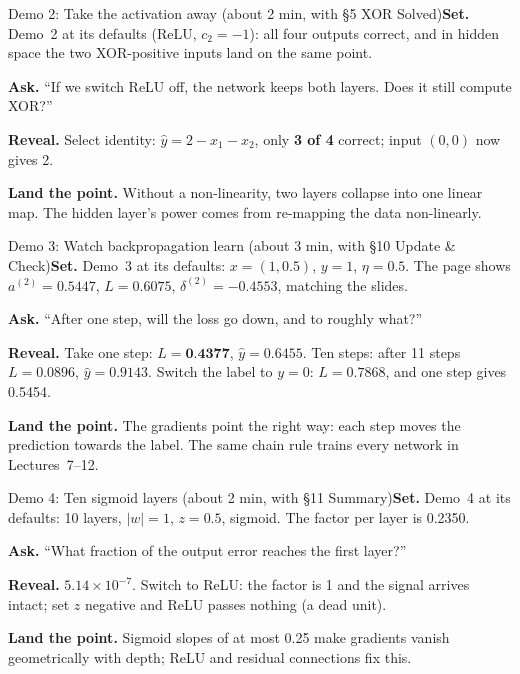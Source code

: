 \documentclass[11pt]{article}
\begin{document}
\begin{live}{Demo 2: Take the activation away (about 2 min, with \S5 XOR Solved)}\textbf{Set.} Demo~2 at its defaults (ReLU, $c_2=-1$): all four outputs correct, and in hidden space the two XOR-positive inputs land on the same point.\par\smallskip\textbf{Ask.} ``If we switch ReLU off, the network keeps both layers. Does it still compute XOR?''\par\smallskip\textbf{Reveal.} Select \textsf{identity}: $\hat y=2-x_1-x_2$, only \textbf{3 of 4} correct; input $(0,0)$ now gives 2.\par\smallskip\textbf{Land the point.} Without a non-linearity, two layers collapse into one linear map. The hidden layer's power comes from re-mapping the data non-linearly.\end{live}

\begin{live}{Demo 3: Watch backpropagation learn (about 3 min, with \S10 Update \& Check)}\textbf{Set.} Demo~3 at its defaults: $x=(1,0.5)$, $y=1$, $\eta=0.5$. The page shows $a^{(2)}=0.5447$, $L=0.6075$, $\delta^{(2)}=-0.4553$, matching the slides.\par\smallskip\textbf{Ask.} ``After one step, will the loss go down, and to roughly what?''\par\smallskip\textbf{Reveal.} \textsf{Take one step}: $L=\textbf{0.4377}$, $\hat y=0.6455$. \textsf{Ten steps}: after 11 steps $L=0.0896$, $\hat y=0.9143$. Switch the label to $y=0$: $L=0.7868$, and one step gives 0.5454.\par\smallskip\textbf{Land the point.} The gradients point the right way: each step moves the prediction towards the label. The same chain rule trains every network in Lectures~7--12.\end{live}

\begin{live}{Demo 4: Ten sigmoid layers (about 2 min, with \S11 Summary)}\textbf{Set.} Demo~4 at its defaults: 10 layers, $|w|=1$, $z=0.5$, sigmoid. The factor per layer is 0.2350.\par\smallskip\textbf{Ask.} ``What fraction of the output error reaches the first layer?''\par\smallskip\textbf{Reveal.} \textbf{$5.14\times10^{-7}$}. Switch to ReLU: the factor is 1 and the signal arrives intact; set $z$ negative and ReLU passes nothing (a dead unit).\par\smallskip\textbf{Land the point.} Sigmoid slopes of at most 0.25 make gradients vanish geometrically with depth; ReLU and residual connections fix this.\end{live}
\end{document}
